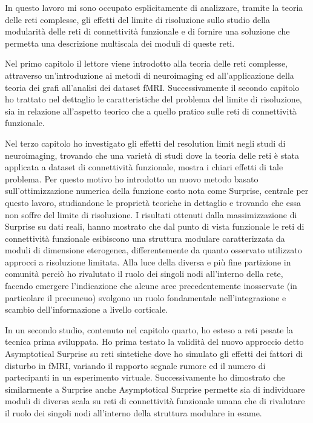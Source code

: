 In questo lavoro mi sono occupato esplicitamente di analizzare, tramite la teoria delle reti complesse, gli effetti del limite di risoluzione sullo studio della modularità delle reti di connettività funzionale e di fornire una soluzione che permetta una descrizione multiscala dei moduli di queste reti.

Nel primo capitolo il lettore viene introdotto alla teoria delle reti complesse, attraverso un'introduzione ai metodi di neuroimaging ed all'applicazione della teoria dei grafi all'analisi dei dataset fMRI.
Successivamente il secondo capitolo ho trattato nel dettaglio le caratteristiche del problema del limite di risoluzione, sia in relazione all'aspetto teorico che a quello pratico sulle reti di connettività funzionale.

Nel terzo capitolo ho investigato gli effetti del resolution limit negli studi di neuroimaging, trovando che una varietà di studi dove la teoria delle reti è stata applicata a dataset di connettività funzionale, mostra i chiari effetti di tale problema.
Per questo motivo ho introdotto un nuovo metodo basato sull'ottimizzazione numerica della funzione costo nota come Surprise, centrale per questo lavoro, studiandone le proprietà teoriche in dettaglio e trovando che essa non soffre del limite di risoluzione.
I risultati ottenuti dalla massimizzazione di Surprise su dati reali, hanno mostrato che dal punto di vista funzionale le reti di connettività funzionale esibiscono una struttura modulare caratterizzata da moduli di dimensione eterogenea, differentemente da quanto osservato utilizzato approcci a risoluzione limitata.
Alla luce della diversa e più fine partizione in comunità perciò ho rivalutato il ruolo dei singoli nodi all'interno della rete, facendo emergere l'indicazione che alcune aree precedentemente inosservate (in particolare il precuneuo) svolgono un ruolo fondamentale nell'integrazione e scambio dell'informazione a livello corticale.

In un secondo studio, contenuto nel capitolo quarto, ho esteso a reti pesate la tecnica prima sviluppata.
Ho prima testato la validità del nuovo approccio detto Asymptotical Surprise su reti sintetiche dove ho simulato gli effetti dei fattori di disturbo in fMRI, variando il rapporto segnale rumore ed il numero di partecipanti in un esperimento virtuale.
Successivamente ho dimostrato che similarmente a Surprise anche Asymptotical Surprise permette sia di individuare moduli di diversa scala su reti di connettività funzionale umana che di rivalutare il ruolo dei singoli nodi all'interno della struttura modulare in esame.

